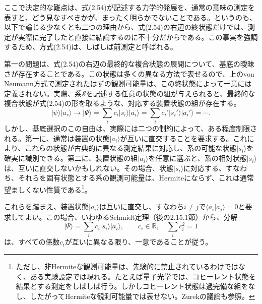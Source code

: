 ここで決定的な難点は、式(2.54)が記述する力学的発展を、通常の意味の測定を表すと、どう見なすべきかが、まったく明らかでないことである。というのも、以下で論じる少なくとも二つの理由から、式(2.54)の右辺の終状態だけでは、測定が実際に完了したと直接に結論するのに不十分だからである。この事実を強調するため、方式(2.54)は、しばしば前測定と呼ばれる。

\hypertarget{srcpage:53}{}\label{srcpage:53}
第一の問題は、式(2.54)の右辺の最終的な複合状態の展開について、基底の曖昧さが存在することである。この状態は多くの異なる方法で表せるので、上のvon Neumann方式で測定されたはずの観測可能量は、この終状態によって一意には定義されない。実際、系$\mathcal S$を記述する任意の状態の組が与えられると、最終的な複合状態が式(2.54)の形を取るような、対応する装置状態の組が存在する。
\begin{equation}\lvert\psi\rangle\lvert a_r\rangle\longrightarrow\lvert\Psi\rangle=\sum_i c_i\lvert s_i\rangle\lvert a_i\rangle=\sum_i c_i'\lvert s_i'\rangle\lvert a_i'\rangle=\cdots.\tag{2.55}\end{equation}
しかし、基底選択のこの自由は、実際には二つの制約によって、ある程度制限される。第一に、通常は装置の状態$\lvert a_i\rangle$が互いに直交することを要求する。これにより、これらの状態が古典的に異なる測定結果に対応し、系の可能な状態$\lvert s_i\rangle$を確実に識別できる。第二に、装置状態の組$\lvert a_i\rangle$を任意に選ぶと、系の相対状態$\lvert s_i\rangle$は、互いに直交しないかもしれない。その場合、状態$\lvert s_i\rangle$に対応する、すなわち、それらを固有状態とする系の観測可能量は、Hermiteにならず、これは通常望ましくない性質である\footnote{ただし、非Hermiteな観測可能量は、先験的に禁止されているわけではなく、ある実験設定では現れる。たとえば量子光学では、コヒーレント状態を結果とする測定をしばしば行う。しかしコヒーレント状態は過完備な組をなし、したがってHermiteな観測可能量では表せない。Zurekの議論\cite{ref016}も参照。}。

これらを踏まえ、装置状態$\lvert a_i\rangle$は互いに直交し、すなわち$i\ne j$で$\langle a_i\vert a_j\rangle=0$と要求してよい。この場合、いわゆるSchmidt定理（後の2.15.1節）から、分解
\begin{equation}\lvert\Psi\rangle=\sum_i c_i\lvert s_i\rangle\lvert a_i\rangle,\qquad c_i\in\mathbb R,\quad\sum_i c_i^2=1\tag{2.56}\end{equation}
は、すべての係数$c_i$が互いに異なる限り、一意であることが従う。

